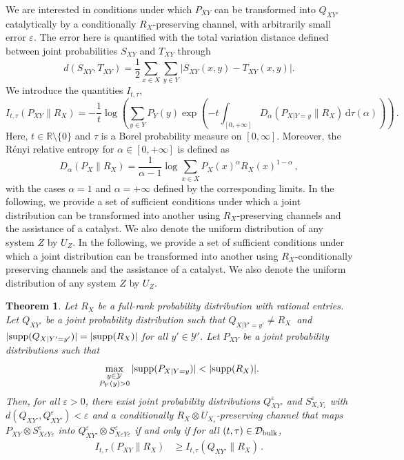 \documentclass[aps,pra,11pt,onecolumn,nofootinbib,tightenlines]{revtex4-2}
\newtheorem{theorem}{Theorem}[section]
\theoremstyle{definition}
\newcommand{\R}{\mathbb{R}}
\newcommand{\mc}[1]{\mathcal{#1}}
\begin{document}
We are interested in conditions under which \(P_{XY}\) can be transformed into \(Q_{XY'}\) catalytically by a conditionally \(R_X\)-preserving channel, with arbitrarily small error $\varepsilon$.
The error here is quantified with the total variation distance defined between joint probabilities $S_{XY}$ and $T_{XY}$ through
\begin{equation}
d(S_{XY},T_{XY})=\frac{1}{2}\sum_{x\in X}\sum_{y\in Y}\big|S_{XY}(x,y)-T_{XY}(x,y)\big|.
\end{equation}
We introduce the quantities $I_{t,\tau}$,
\begin{equation}
I_{t,\tau}(P_{XY}\|R_X)=-\frac{1}{t}\log{\left(\sum_{y\in Y}P_Y(y)\exp{\left(-t\int_{[0,+\infty]}D_\alpha(P_{X|Y=y}\|R_X)\,\mathrm{d}\tau(\alpha)\right)}\right)} \,.
\end{equation}
Here, $t\in\R\setminus\{0\}$ and $\tau$ is a Borel probability measure on $[0,\infty]$. Moreover, the R\'enyi relative entropy for $\alpha \in [0,+\infty]$ is defined as
\begin{equation}
    D_\alpha(P_X\|R_X)=
\frac{1}{\alpha-1}\log{\sum_{x\in X}P_X(x)^\alpha R_X(x)^{1-\alpha}}\,,
\end{equation}
with the cases \(\alpha=1\) and \(\alpha=+\infty\) defined by the corresponding limits.
In the following, we provide a set of sufficient conditions under which a joint distribution can be transformed into another using $ R_X$-preserving channels  and the assistance of a catalyst. We also denote the uniform distribution of any system $Z$ by $U_Z$.
In the following, we provide a set of sufficient conditions under which a joint distribution can be transformed into another using $ R_X$-conditionally preserving channels and the assistance of a catalyst. We also denote the uniform distribution of any system $Z$ by $U_Z$.
\begin{theorem}\label{thm:ConservedClassical}
Let $R_X$ be a full-rank probability distribution with rational entries. Let $Q_{XY'}$ be a joint probability distribution such that $Q_{X|Y'=y'}\neq R_X\ $ and $|{\rm supp}(Q_{X|Y'=y'})|=|{\rm supp}(R_X)|$ for all $y'\in \mc Y'$. Let $P_{XY}$ be a joint probability distributions such that
\begin{equation}
\max \limits_{\substack{y \in \mathcal{Y} \\ P_Y( y) > 0}} |{\rm supp}(P_{X|Y=y})|<|{\rm supp}(R_X)|.
\end{equation}
Then, for all $\varepsilon>0$, there exist joint probability distributions $Q^\varepsilon_{XY'}$ and $S^\varepsilon_{X_\varepsilon Y_\varepsilon}$ with $d(Q_{XY'},Q^\varepsilon_{XY'})<\varepsilon$ and a conditionally $R_X\otimes U_{X_\varepsilon}$-preserving channel that maps $P_{XY}\otimes S^\varepsilon_{X\varepsilon Y\varepsilon}$ into $Q^\varepsilon_{XY'}\otimes S^\varepsilon_{X\varepsilon Y\varepsilon}$ if and only if for all $(t,\tau)\in\mc D_{\rm bulk}$,
\begin{align}
I_{t,\tau}(P_{XY}\|R_X)&\geq I_{t,\tau}(Q_{XY'}\|R_X)\,.
\end{align}
\end{theorem}
\end{document}

